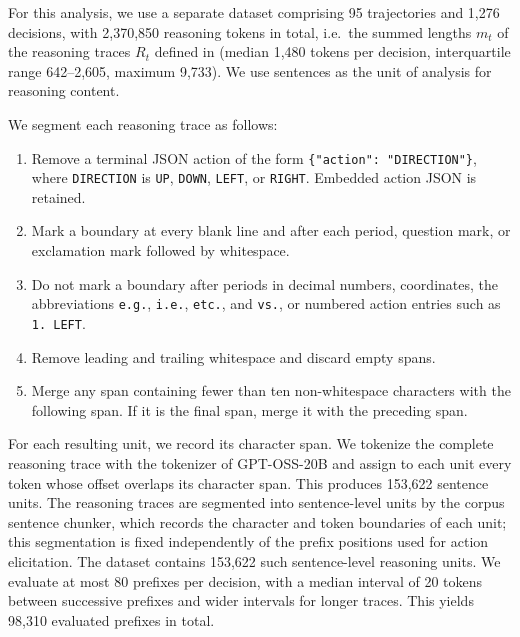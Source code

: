\documentclass{article}
\begin{document}
For this analysis, we use a separate dataset comprising 95 trajectories and 1,276 decisions, with 2,370,850 reasoning tokens in total, i.e.\ the summed lengths $m_t$ of the reasoning traces $R_t$ defined in  (median 1,480 tokens per decision, interquartile range 642--2,605, maximum 9,733).
We use sentences as the unit of analysis for reasoning content.  

We segment each reasoning trace as follows:
\begin{enumerate}
    \item Remove a terminal JSON action of the form
    \texttt{\{"action": "DIRECTION"\}}, where \texttt{DIRECTION} is
    \texttt{UP}, \texttt{DOWN}, \texttt{LEFT}, or \texttt{RIGHT}.
    Embedded action JSON is retained.
    \item Mark a boundary at every blank line and after each period,
    question mark, or exclamation mark followed by whitespace.
    \item Do not mark a boundary after periods in decimal numbers,
    coordinates, the abbreviations \texttt{e.g.}, \texttt{i.e.},
    \texttt{etc.}, and \texttt{vs.}, or numbered action entries such as
    \texttt{1. LEFT}.
    \item Remove leading and trailing whitespace and discard empty spans.
    \item Merge any span containing fewer than ten non-whitespace
    characters with the following span. If it is the final span, merge it
    with the preceding span.
\end{enumerate}
For each resulting unit, we record its character span. We tokenize the complete reasoning trace with the tokenizer of GPT-OSS-20B  and assign to each unit every token whose offset overlaps its character span. This produces 153,622 sentence units. 
The reasoning traces are segmented into sentence-level units by the corpus sentence chunker, which records the character and token boundaries of each unit; this segmentation is fixed independently of the prefix positions used for action elicitation.
The dataset contains 153,622 such sentence-level reasoning units. We evaluate at most 80 prefixes per decision, with a median interval of 20 tokens between successive prefixes and wider intervals for longer traces. This yields 98,310 evaluated prefixes in total.



\end{document}
